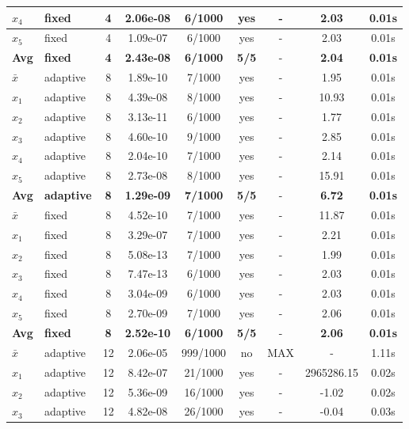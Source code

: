 \begin{longtable}{|l|l|c|c|c|c|c|c|c|}
\hline
$x_4$ & fixed & 4 & 2.06e-08 & 6/1000 & yes & - & 2.03 & 0.01s \\
\hline
$x_5$ & fixed & 4 & 1.09e-07 & 6/1000 & yes & - & 2.03 & 0.01s \\
\hline
\hline\hline
\textbf{Avg} & \textbf{fixed} & \textbf{4} & \textbf{2.43e-08} & \textbf{6/1000} & \textbf{5/5} & - & \textbf{2.04} & \textbf{0.01s} \\
\hline\hline
$\bar{x}$ & adaptive & 8 & 1.89e-10 & 7/1000 & yes & - & 1.95 & 0.01s \\
\hline
$x_1$ & adaptive & 8 & 4.39e-08 & 8/1000 & yes & - & 10.93 & 0.01s \\
\hline
$x_2$ & adaptive & 8 & 3.13e-11 & 6/1000 & yes & - & 1.77 & 0.01s \\
\hline
$x_3$ & adaptive & 8 & 4.60e-10 & 9/1000 & yes & - & 2.85 & 0.01s \\
\hline
$x_4$ & adaptive & 8 & 2.04e-10 & 7/1000 & yes & - & 2.14 & 0.01s \\
\hline
$x_5$ & adaptive & 8 & 2.73e-08 & 8/1000 & yes & - & 15.91 & 0.01s \\
\hline
\hline\hline
\textbf{Avg} & \textbf{adaptive} & \textbf{8} & \textbf{1.29e-09} & \textbf{7/1000} & \textbf{5/5} & - & \textbf{6.72} & \textbf{0.01s} \\
\hline\hline
\hline
$\bar{x}$ & fixed & 8 & 4.52e-10 & 7/1000 & yes & - & 11.87 & 0.01s \\
\hline
$x_1$ & fixed & 8 & 3.29e-07 & 7/1000 & yes & - & 2.21 & 0.01s \\
\hline
$x_2$ & fixed & 8 & 5.08e-13 & 7/1000 & yes & - & 1.99 & 0.01s \\
\hline
$x_3$ & fixed & 8 & 7.47e-13 & 6/1000 & yes & - & 2.03 & 0.01s \\
\hline
$x_4$ & fixed & 8 & 3.04e-09 & 6/1000 & yes & - & 2.03 & 0.01s \\
\hline
$x_5$ & fixed & 8 & 2.70e-09 & 7/1000 & yes & - & 2.06 & 0.01s \\
\hline
\hline\hline
\textbf{Avg} & \textbf{fixed} & \textbf{8} & \textbf{2.52e-10} & \textbf{6/1000} & \textbf{5/5} & - & \textbf{2.06} & \textbf{0.01s} \\
\hline\hline
$\bar{x}$ & adaptive & 12 & 2.06e-05 & 999/1000 & no & MAX & - & 1.11s \\
\hline
$x_1$ & adaptive & 12 & 8.42e-07 & 21/1000 & yes & - & 2965286.15 & 0.02s \\
\hline
$x_2$ & adaptive & 12 & 5.36e-09 & 16/1000 & yes & - & -1.02 & 0.02s \\
\hline
$x_3$ & adaptive & 12 & 4.82e-08 & 26/1000 & yes & - & -0.04 & 0.03s \\

\end{longtable}

